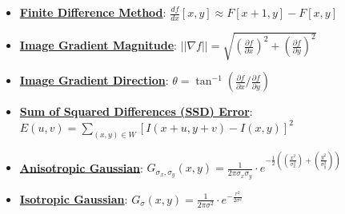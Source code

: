 \documentclass{article}%
\begin{document}
\begin{itemize}[leftmargin=*]%
\item \href{https://www.math.purdue.edu/~yipn/351/08L2-Feature Extraction.pdf#page=15}{\textbf{Finite Difference Method}}: $\frac{df}{dx} [x, y] \approx F[x + 1, y] - F[x, y]$%
\item \href{https://www.math.purdue.edu/~yipn/351/08L2-Feature Extraction.pdf#page=17}{\textbf{Image Gradient Magnitude}}: $||\nabla f|| = \sqrt{(\frac{\partial f}{\partial x})^2 + (\frac{\partial f}{\partial y})^2}$%
\item \href{https://www.math.purdue.edu/~yipn/351/08L2-Feature Extraction.pdf#page=34}{\textbf{Image Gradient Direction}}: $\theta = \tan^{-1}(\frac{\partial f}{\partial x} / \frac{\partial f}{\partial y})$%
\item \href{https://www.math.purdue.edu/~yipn/351/08L2-Feature Extraction.pdf#page=25}{\textbf{Sum of Squared Differences (SSD) Error}}: $E(u, v) = \sum_{(x,y) \in W} [I(x + u, y + v) - I(x, y)]^2$%
\item \href{https://www.math.purdue.edu/~yipn/351/08L2-Feature Extraction.pdf#page=43}{\textbf{Anisotropic Gaussian}}: $G_{\sigma_x, \sigma_y}(x, y) = \frac{1}{2\pi\sigma_x\sigma_y} \cdot e^{-\frac{1}{2}((\frac{x^2}{\sigma_x^2}) + (\frac{y^2}{\sigma_y^2}))}$%
\item \href{https://www.math.purdue.edu/~yipn/351/08L2-Feature Extraction.pdf#page=43}{\textbf{Isotropic Gaussian}}: $G_\sigma(x, y) = \frac{1}{2\pi\sigma^2} \cdot e^{-\frac{r^2}{2\sigma^2}}$%
\end{itemize}%
\end{document}
